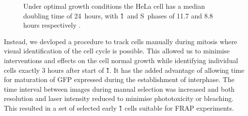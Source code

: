       \begin{figure}
        \centering
        \newcommand{\slice}[4]{
          \pgfmathparse{0.5*#1+0.5*#2}
          \let\midangle\pgfmathresult

          \draw[thick,fill=black!10] (0,0) -- (#1:1) arc (#1:#2:1) -- cycle;

          \node[label=\midangle:#4] at (\midangle:1) {};

          \pgfmathparse{min((#2-#1-10)/110*(-0.3),0)}
          \let\temp\pgfmathresult
          \pgfmathparse{max(\temp,-0.5) + 0.8}
          \let\innerpos\pgfmathresult
          \node at (\midangle:\innerpos) {#3};
        }
          {
            Under optimal growth conditions the HeLa cell has a median
            doubling time of 24~hours, with \G1~and
            S~phases of 11.7 and 8.8 hours respectively \citep{HeLaCellCycle}.
          }
        \label{fig:kill-frap:cell-cycle}
      \end{figure}

    Instead, we devloped a procedure to track cells manually during mitosis 
    where visual identification of the cell cycle is possible. 
    This allowed us to minimise interventions and effects on the cell normal growth
    while identifying individual cells exactly 3 hours after start of \G1{}.
    It has the added advantage of allowing time for maturation of GFP 
    expressed during the establishment of interphase.
    The time interval between images during manual selection was increased and 
    both resolution and laser intensity reduced to minimise phototoxicity or bleaching.
    This resulted in a set of selected early \G1{} cells suitable for FRAP experiments.

